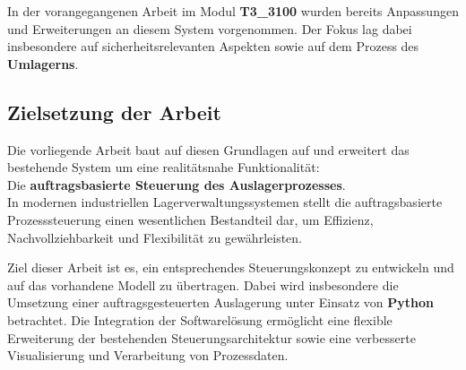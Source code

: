 In der vorangegangenen Arbeit im Modul \textbf{T3\_3100} wurden bereits Anpassungen und Erweiterungen an diesem System vorgenommen. Der Fokus lag dabei insbesondere auf sicherheitsrelevanten Aspekten sowie auf dem Prozess des \textbf{Umlagerns}.\newpage

\subsection{Zielsetzung der Arbeit}

Die vorliegende Arbeit baut auf diesen Grundlagen auf und erweitert das bestehende System um eine realitätsnahe Funktionalität:\\
Die \textbf{auftragsbasierte Steuerung des Auslagerprozesses}.\\
In modernen industriellen Lagerverwaltungssystemen stellt die auftragsbasierte Prozesssteuerung einen wesentlichen Bestandteil dar, um Effizienz, Nachvollziehbarkeit und Flexibilität zu gewährleisten.

Ziel dieser Arbeit ist es, ein entsprechendes Steuerungskonzept zu entwickeln und auf das vorhandene Modell zu übertragen. Dabei wird insbesondere die Umsetzung einer auftragsgesteuerten Auslagerung unter Einsatz von \textbf{Python} betrachtet. Die Integration der Softwarelösung ermöglicht eine flexible Erweiterung der bestehenden Steuerungsarchitektur sowie eine verbesserte Visualisierung und Verarbeitung von Prozessdaten.\\